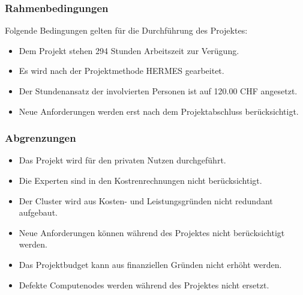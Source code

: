 \subsubsection{Rahmenbedingungen} 
\label{sec:Rahmenbedingungen}

Folgende Bedingungen gelten für die Durchführung des Projektes:
\begin{itemize}
	\item Dem Projekt stehen 294 Stunden Arbeitszeit zur Verügung.
	\item Es wird nach der Projektmethode HERMES gearbeitet.
	\item Der Stundenansatz der involvierten Personen ist auf 120.00 CHF angesetzt.
	\item Neue Anforderungen werden erst nach dem Projektabschluss berücksichtigt.
\end{itemize}

\subsubsection{Abgrenzungen} 
\label{sec:Abgrenzungen}
\begin{itemize}
	\item Das Projekt wird für den privaten Nutzen durchgeführt.
	\item Die Experten sind in den Kostrenrechnungen nicht berücksichtigt.
	\item Der Cluster wird aus Kosten- und Leistungsgründen nicht redundant aufgebaut.
	\item Neue Anforderungen können während des Projektes nicht berücksichtigt werden.
	\item Das Projektbudget kann aus finanziellen Gründen nicht erhöht werden.
	\item Defekte Computenodes werden während des Projektes nicht ersetzt.
\end{itemize}
